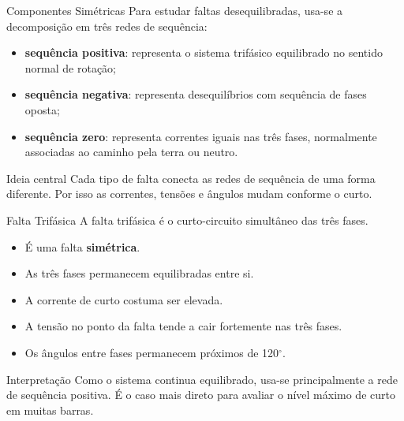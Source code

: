 \documentclass[aspectratio=169,11pt]{beamer}
\begin{document}
\begin{frame}{Componentes Simétricas}
  Para estudar faltas desequilibradas, usa-se a decomposição em três redes de sequência:

  \begin{itemize}
    \item \textbf{sequência positiva}: representa o sistema trifásico equilibrado no sentido normal de rotação;
    \item \textbf{sequência negativa}: representa desequilíbrios com sequência de fases oposta;
    \item \textbf{sequência zero}: representa correntes iguais nas três fases, normalmente associadas ao caminho pela terra ou neutro.
  \end{itemize}

  \begin{block}{Ideia central}
    Cada tipo de falta conecta as redes de sequência de uma forma diferente. Por isso as correntes, tensões e ângulos mudam conforme o curto.
  \end{block}
\end{frame}

\begin{frame}{Falta Trifásica}
  A falta trifásica é o curto-circuito simultâneo das três fases.

  \begin{itemize}
    \item É uma falta \textbf{simétrica}.
    \item As três fases permanecem equilibradas entre si.
    \item A corrente de curto costuma ser elevada.
    \item A tensão no ponto da falta tende a cair fortemente nas três fases.
    \item Os ângulos entre fases permanecem próximos de 120$^\circ$.
  \end{itemize}

  \begin{block}{Interpretação}
    Como o sistema continua equilibrado, usa-se principalmente a rede de sequência positiva. É o caso mais direto para avaliar o nível máximo de curto em muitas barras.
  \end{block}
\end{frame}
\end{document}
